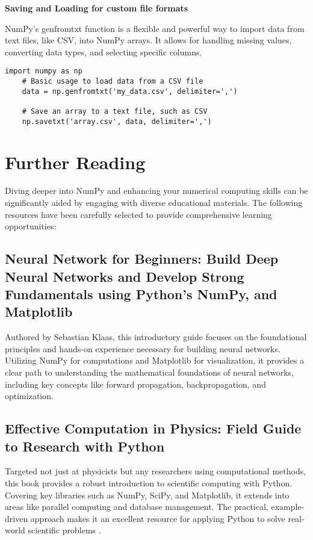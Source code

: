 \textbf{Saving and Loading for custom file formats}

NumPy's genfromtxt function is a flexible and powerful way to import data from text files, like CSV, into NumPy arrays. It allows for handling missing values, converting data types, and selecting specific columns.

\begin{lstlisting}[caption={Example code for loading and saving data using NumPy}, label={code:numpy-load-save}, style=pythonstyle]
	import numpy as np
	# Basic usage to load data from a CSV file
	data = np.genfromtxt('my_data.csv', delimiter=',')
	
	# Save an array to a text file, such as CSV
	np.savetxt('array.csv', data, delimiter=',')
\end{lstlisting}


\section{Further Reading}

Diving deeper into NumPy and enhancing your numerical computing skills can be significantly aided by engaging with diverse educational materials. The following resources have been carefully selected to provide comprehensive learning opportunities:

\subsection{Neural Network for Beginners: Build Deep Neural Networks and Develop Strong Fundamentals using Python’s NumPy, and Matplotlib}
Authored by Sebastian Klaas, this introductory guide focuses on the foundational principles and hands-on experience necessary for building neural networks. Utilizing NumPy for computations and Matplotlib for visualization, it provides a clear path to understanding the mathematical foundations of neural networks, including key concepts like forward propagation, backpropagation, and optimization\cite{Sewak:2018}.

\subsection{Effective Computation in Physics: Field Guide to Research with Python}
Targeted not just at physicists but any researchers using computational methods, this book provides a robust introduction to scientific computing with Python. Covering key libraries such as NumPy, SciPy, and Matplotlib, it extends into areas like parallel computing and database management. The practical, example-driven approach makes it an excellent resource for applying Python to solve real-world scientific problems \cite{McKinney:2012}.

